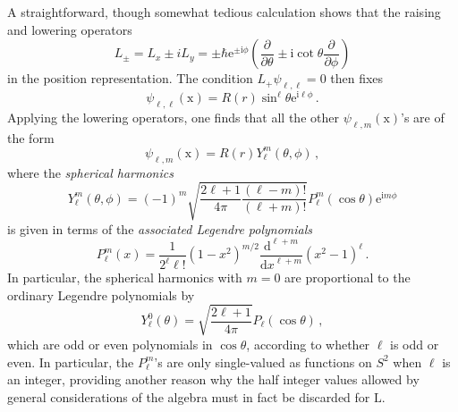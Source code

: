 \documentclass{article}
\theoremstyle{plain}\theoremheaderfont{\normalfont\itshape}\theorembodyfont{\rmfamily}\theoremseparator{.}\newtheorem*{rem}{Remark}\newtheorem*{ex}{Example}\newtheorem*{proof}{Proof}\newtheorem*{altp}{Alternative proof}
\theoremstyle{plain}\theoremheaderfont{\normalfont\bfseries}\theorembodyfont{\rmfamily}\theoremseparator{.}\newtheorem{thm}{Theorem}[section]\newtheorem{lem}[thm]{Lemma}\newtheorem{prop}[thm]{Proposition}\newtheorem*{cor}{Corollary}\newtheorem{defn}[thm]{Definition}\newtheorem{clm}[thm]{Claim}\newtheorem{clminproof}{Claim}
\theoremstyle{break}\theoremheaderfont{\normalfont\itshape}\theorembodyfont{\rmfamily}\theoremseparator{.\medskip}\newtheorem*{proofskip}{Proof}\newtheorem*{exs}{Examples}\newtheorem*{rems}{Remarks}
\theoremstyle{break}\theoremheaderfont{\normalfont\bfseries}\theorembodyfont{\rmfamily}\theoremseparator{.\medskip}\newtheorem{lemskip}[thm]{Lemma}\newtheorem{defnskip}[thm]{Definition}\newtheorem{propskip}[thm]{Proposition}\newtheorem{thmskip}[thm]{Theorem}
\numberwithin{equation}{section}
\newcommand{\ii}{\mathrm{i}}
\newcommand{\ee}{\mathrm{e}}
\newcommand{\dv}[3][]{\frac{\mathrm{d}^{#1} #2}{{\mathrm{d} #3}^{#1}}}
\newcommand{\pdv}[3][]{\frac{\partial^{#1} #2}{{\partial #3}^{#1}}}
\newcommand{\vb}[1]{\bm{\mathrm{#1}}}
\begin{document}
    A straightforward, though somewhat tedious calculation shows that the raising and lowering operators
    \begin{equation}
        L_{\pm}=L_{x}\pm iL_{y}=\pm\hbar \ee^{\pm \ii\phi}\left(\pdv{}{\theta}\pm \ii\cot\theta\pdv{}{\phi}\right)
    \end{equation}
    in the position representation. The condition \(L_+ \psi_{\ell,\ell}=0\) then fixes
    \begin{equation}
        \psi_{\ell,\ell}(\vb{x})=R(r)\sin^\ell\theta \ee^{\ii \ell\phi}\,.
    \end{equation}
    Applying the lowering operators, one finds that all the other \(\psi_{\ell,m}(\vb{x})\)'s are of the form
    \begin{equation}
        \psi_{\ell,m}(\vb{x})=R(r)Y_{\ell}^{m}(\theta,\phi)\,,
    \end{equation}
    where the \textit{spherical harmonics}
    \begin{equation}
        Y_{\ell}^{m}(\theta,\phi)=(-1)^m\sqrt{\frac{2\ell+1}{4\pi}\frac{(\ell-m)!}{(\ell+m)!}}P_{\ell}^{m}(\cos\theta)\ee^{\ii m\phi}
    \end{equation}
    is given in terms of the \textit{associated Legendre polynomials}
    \begin{equation}
        P_{\ell}^{m}(x)=\frac{1}{2^\ell \ell!}(1-x^2)^{m/2}\dv[\ell+m]{}{x}(x^2-1)^\ell\,.
    \end{equation}
    In particular, the spherical harmonics with \(m=0\) are proportional to the ordinary Legendre polynomials by
    \begin{equation}
        Y_\ell^0(\theta)=\sqrt{\frac{2\ell+1}{4\pi}}P_\ell(\cos\theta)\,,
    \end{equation}
    which are odd or even polynomials in \(\cos\theta\), according to whether \(\ell\) is odd or even. In particular, the \(P_\ell^m\)'s are only single-valued as functions on \(S^2\) when \(\ell\) is an integer, providing another reason why the half integer values allowed by general considerations of the algebra must in fact be discarded for \(\vb{L}\).
\end{document}
